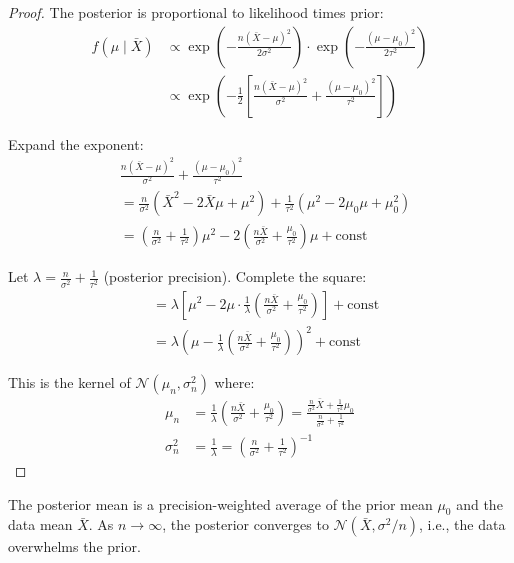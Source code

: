 \begin{proof}
The posterior is proportional to likelihood times prior:
\begin{align}
f(\mu \mid \bar{X}) &\propto \exp\left(-\frac{n(\bar{X} - \mu)^2}{2\sigma^2}\right) \cdot \exp\left(-\frac{(\mu - \mu_0)^2}{2\tau^2}\right) \\
&\propto \exp\left(-\frac{1}{2}\left[\frac{n(\bar{X} - \mu)^2}{\sigma^2} + \frac{(\mu - \mu_0)^2}{\tau^2}\right]\right)
\end{align}

Expand the exponent:
\begin{align}
&\frac{n(\bar{X} - \mu)^2}{\sigma^2} + \frac{(\mu - \mu_0)^2}{\tau^2} \\
&= \frac{n}{\sigma^2}(\bar{X}^2 - 2\bar{X}\mu + \mu^2) + \frac{1}{\tau^2}(\mu^2 - 2\mu_0\mu + \mu_0^2) \\
&= \left(\frac{n}{\sigma^2} + \frac{1}{\tau^2}\right)\mu^2 - 2\left(\frac{n\bar{X}}{\sigma^2} + \frac{\mu_0}{\tau^2}\right)\mu + \text{const}
\end{align}

Let $\lambda = \frac{n}{\sigma^2} + \frac{1}{\tau^2}$ (posterior precision). Complete the square:
\begin{align}
&= \lambda\left[\mu^2 - 2\mu \cdot \frac{1}{\lambda}\left(\frac{n\bar{X}}{\sigma^2} + \frac{\mu_0}{\tau^2}\right)\right] + \text{const} \\
&= \lambda\left(\mu - \frac{1}{\lambda}\left(\frac{n\bar{X}}{\sigma^2} + \frac{\mu_0}{\tau^2}\right)\right)^2 + \text{const}
\end{align}

This is the kernel of $\mathcal{N}(\mu_n, \sigma_n^2)$ where:
\begin{align}
\mu_n &= \frac{1}{\lambda}\left(\frac{n\bar{X}}{\sigma^2} + \frac{\mu_0}{\tau^2}\right) = \frac{\frac{n}{\sigma^2}\bar{X} + \frac{1}{\tau^2}\mu_0}{\frac{n}{\sigma^2} + \frac{1}{\tau^2}} \\
\sigma_n^2 &= \frac{1}{\lambda} = \left(\frac{n}{\sigma^2} + \frac{1}{\tau^2}\right)^{-1}
\end{align}
\end{proof}

\begin{remark}[Interpretation]
The posterior mean is a precision-weighted average of the prior mean $\mu_0$ and the data mean $\bar{X}$. As $n \to \infty$, the posterior converges to $\mathcal{N}(\bar{X}, \sigma^2/n)$, i.e., the data overwhelms the prior.
\end{remark}

